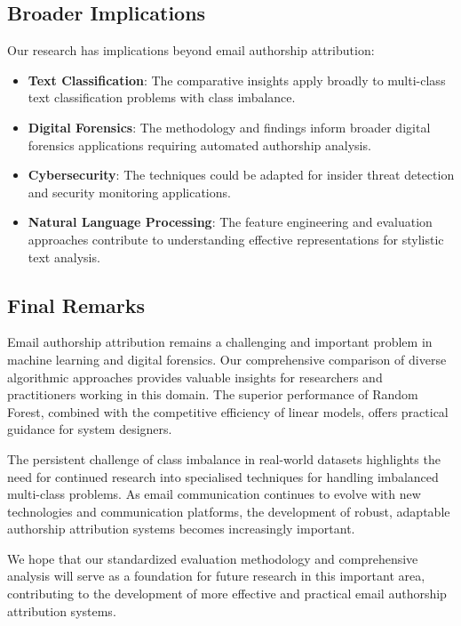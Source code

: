 \documentclass[11pt,a4paper]{article}
\begin{document}
\subsection{Broader Implications}

Our research has implications beyond email authorship attribution:

\begin{itemize}
    \item \textbf{Text Classification}: The comparative insights apply broadly to multi-class text classification problems with class imbalance.
    
    \item \textbf{Digital Forensics}: The methodology and findings inform broader digital forensics applications requiring automated authorship analysis.
    
    \item \textbf{Cybersecurity}: The techniques could be adapted for insider threat detection and security monitoring applications.
    
    \item \textbf{Natural Language Processing}: The feature engineering and evaluation approaches contribute to understanding effective representations for stylistic text analysis.
\end{itemize}

\subsection{Final Remarks}

Email authorship attribution remains a challenging and important problem in machine learning and digital forensics. Our comprehensive comparison of diverse algorithmic approaches provides valuable insights for researchers and practitioners working in this domain. The superior performance of Random Forest, combined with the competitive efficiency of linear models, offers practical guidance for system designers.

The persistent challenge of class imbalance in real-world datasets highlights the need for continued research into specialised techniques for handling imbalanced multi-class problems. As email communication continues to evolve with new technologies and communication platforms, the development of robust, adaptable authorship attribution systems becomes increasingly important.

We hope that our standardized evaluation methodology and comprehensive analysis will serve as a foundation for future research in this important area, contributing to the development of more effective and practical email authorship attribution systems.
\end{document}
